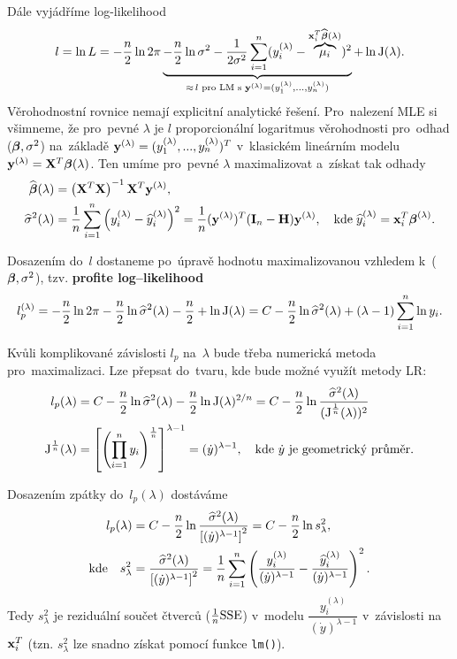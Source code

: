 Dále vyjádříme log-likelihood
 $$
 l = \ln L = -\frac{n}{2}\ln 2 \pi \underbrace{- \frac{n}{2}\ln \sigma^2 - \frac{1}{2 \sigma^2} \sum\limits_{i=1}^{n} (y_i^{(\lambda)} - \overbrace{\mu_i}^{\mathbf{x}_i^T \widehat{\boldsymbol{\beta}}(\lambda)})^2}_{\approx \, l \text{ pro~LM s~} \mathbf{y}^{(\lambda)} = (y_1^{(\lambda)}, ..., y_n^{(\lambda)})} + \ln\text{J}(\lambda).
 $$
Věrohodnostní rovnice nemají explicitní analytické řešení. Pro~nalezení MLE si všimneme, že pro~pevné $\lambda$ je $l$ proporcionální logaritmus věrohodnosti pro~odhad ($\boldsymbol{\beta}, \sigma^2$) na~základě $\mathbf{y}^{(\lambda)} = (y_1^{(\lambda)},..., y_n^{(\lambda)})^T$ v~klasickém lineárním modelu $\mathbf{y}^{(\lambda)} = \mathbf{X}^T \boldsymbol{\beta}(\lambda)$. Ten umíme pro~pevné $\lambda$ maximalizovat a~získat tak odhady
 \begin{align*}
 \widehat{\boldsymbol{\beta}} (\lambda) & = \left(\mathbf{X}^T \mathbf{X} \right)^{-1}  \mathbf{X}^T \mathbf{y}^{(\lambda)}, \\
\widehat{\sigma}^2 (\lambda) & = \frac{1}{n} \sum\limits_{i=1}^{n} \left(y_i^{(\lambda)} - \widehat{y} _i^{(\lambda)}\right)^2 = \frac{1}{n} (\mathbf{y}^{(\lambda)})^T (\textbf{I} _n - \textbf{H}) \mathbf{y}^{(\lambda)}, \quad \text{kde} \; \widehat{y}_i^{(\lambda)} = \mathbf{x}_i^T \boldsymbol{\beta}^{(\lambda)}.
 \end{align*}

Dosazením do~$l$ dostaneme po~úpravě hodnotu maximalizovanou vzhledem k~($\boldsymbol{\beta}, \sigma^2$), tzv. \textbf{profite log--likelihood}
 $$
  l_p^{(\lambda)} = -\frac{n}{2} \ln 2 \pi - \frac{n}{2} \ln \widehat{\sigma}^2 (\lambda) - \frac{n}{2} + \ln \text{J}(\lambda)
 = C - \frac{n}{2} \ln \widehat{\sigma}^2 (\lambda) + (\lambda - 1)  \sum\limits_{i=1}^{n} \ln y_i.
 $$
\begin{remark}
Kvůli komplikované závislosti $l_p$ na~$\lambda$ bude třeba numerická metoda pro~maximalizaci. Lze přepsat do~tvaru, kde bude možné využít metody LR:
\begin{align*}
 l_p (\lambda) & = C - \frac{n}{2} \ln \widehat{\sigma}^2 (\lambda)  - \frac{n}{2} \ln\text{J}(\lambda)^{2/n} = C - \frac{n}{2} \ln \frac{ \widehat{\sigma}^2 (\lambda)}{(\text{J}^{\frac{1}{n}}(\lambda))^2} \\
 \text{J}^{\frac{1}{n}}(\lambda) & = \left[\left(\prod_{i = 1}^n y_i \right)^{\frac{1}{n}} \right]^{\lambda - 1} = (\dot{y})^{\lambda - 1}, \quad \text{kde } \dot{y} \text{ je geometrický průměr.}
\end{align*}
\end{remark}
Dosazením zpátky do~$l_p(\lambda)$ dostáváme
\begin{align*}
\quad  l_p(\lambda) & = C - \frac{n}{2} \ln \frac{ \widehat{\sigma}^2 (\lambda)}{\left[(\dot{y})^{\lambda - 1}\right]^2} = C - \frac{n}{2}\ln s_{\lambda}^2, \\
\text{kde} \quad s_{\lambda}^2 & = \frac{ \widehat{\sigma}^2 (\lambda)}{\left[(\dot{y})^{\lambda - 1}\right]^2} = \frac{1}{n} \sum\limits_{i=1}^{n} \left(\frac{y_i^{(\lambda)}}{(\dot{y})^{\lambda-1}} - \frac{\widehat{y}_i^{(\lambda)}}{(\dot{y})^{\lambda-1}} \right)^2.
\end{align*}
Tedy $s_{\lambda}^2$ je reziduální součet čtverců ($\frac{1}{n}\mathrm{SSE}$) v~modelu $\dfrac{y_i^{(\lambda)}}{(\dot{y})^{\lambda-1}}$ v~závislosti na~$\mathbf{x}_i^T$ (tzn. $s_{\lambda}^2$ lze snadno získat pomocí funkce \verb|lm()|).

